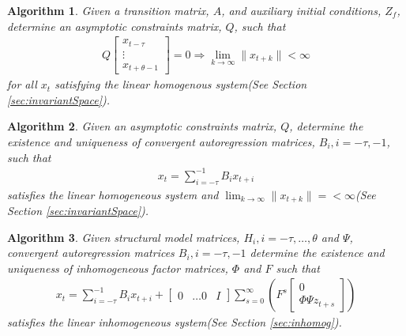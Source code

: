 \documentclass{article}
\newtheorem{rslt}{Algorithm}
\begin{document}
{\begin{rslt}
Given a transition matrix, $A$, and auxiliary initial conditions,
$Z_f$, 
determine an {\em asymptotic constraints matrix},
$Q$, such that
\begin{gather*}
Q 
\begin{bmatrix}
  x_{t-\tau}\\\vdots\\x_{t+\theta-1}
\end{bmatrix}=0 \Longrightarrow \lim_{k\rightarrow \infty} \|x_{t+k}\| < \infty
\end{gather*}
for all $x_t$ satisfying the linear homogenous system(See Section \ref{sec:invariantSpace}).
\end{rslt}



\begin{rslt}
Given an asymptotic constraints matrix, $Q$,
determine the existence and uniqueness of {\em convergent autoregression matrices}, $B_i,i=-\tau,-1$,
such that
  \begin{gather*}
 x_t=\sum_{i=-\tau}^{-1} B_i x_{t+i}
  \end{gather*}
 satisfies the linear homogeneous system and    
$\lim_{k\rightarrow \infty} \|x_{t+k}\| =<\infty$(See Section \ref{sec:invariantSpace}).
\end{rslt}

\begin{rslt}
Given structural model matrices, $H_i, i=-\tau,\ldots,\theta$ and $\Psi$,
 convergent autoregression matrices $B_i,i=-\tau,-1$
determine the existence and uniqueness of 
{\em inhomogeneous factor matrices}, $\Phi$ and $F$ such that
\begin{gather*}
 x_t=\sum_{i=-\tau}^{-1} B_i x_{t+i} + 
  \begin{bmatrix}
  0&\dots 0&I
  \end{bmatrix}
\sum_{s=0}^\infty ( F^{s} 
\begin{bmatrix}
0\\
\Phi \Psi z_{t+s}  
\end{bmatrix})
\end{gather*}
satisfies the linear inhomogeneous system(See Section \ref{sec:inhomog}).
\end{rslt}

}
\end{document}
